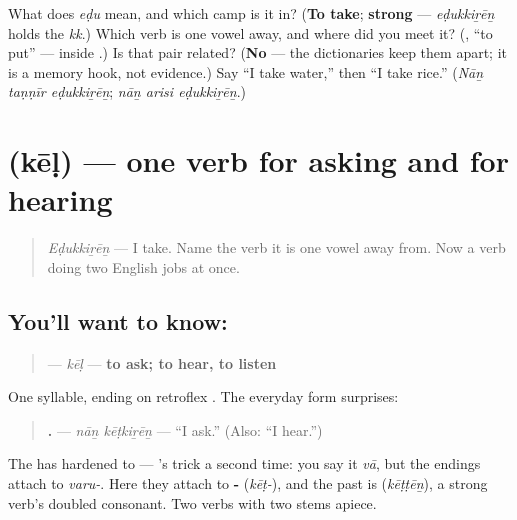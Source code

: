\begin{tcolorbox}[breakable,colback=teal!4,colframe=teal!35!black,title={Before you move on}]
What does \emph{eḍu} mean, and which camp is it in? (\textbf{To take}; \textbf{strong} — \emph{eḍukkiṟēṉ} holds the \emph{kk}.) Which verb is one vowel away, and where did you meet it? (\emph{\textbf{}}, \textquotedblleft{}to put\textquotedblright{} — inside \textbf{}.) Is that pair related? (\textbf{No} — the dictionaries keep them apart; it is a memory hook, not evidence.) Say \textquotedblleft{}I take water,\textquotedblright{} then \textquotedblleft{}I take rice.\textquotedblright{} (\emph{Nāṉ taṇṇīr eḍukkiṟēṉ}; \emph{nāṉ arisi eḍukkiṟēṉ}.)
\end{tcolorbox}
\section[\texorpdfstring{\ta{கேள்} (kēḷ)}{கேள் (kēḷ)}]{ (kēḷ) — one verb for asking and for hearing}

\label{lesson:TA-C34-kel}



\begin{quote}
\emph{Eḍukkiṟēṉ} — I take. Name the verb it is one vowel away from. Now a verb doing two English jobs at once.
\end{quote}

\subsection*{You'll want to know: }
\begin{quote}
\textbf{} — \emph{kēḷ} — \textbf{to ask; to hear, to listen}
\end{quote}

One syllable, ending on retroflex \textbf{}. The everyday form surprises:

\begin{quote}
\textbf{ .} — \emph{nāṉ kēṭkiṟēṉ} — \textquotedblleft{}I ask.\textquotedblright{} (Also: \textquotedblleft{}I hear.\textquotedblright{})
\end{quote}

The \textbf{} has hardened to \textbf{} — \textbf{}'s trick a second time: you say it \emph{vā}, but the endings attach to \emph{varu-}. Here they attach to \textbf{-} (\emph{kēṭ-}), and the past is \textbf{} (\emph{kēṭṭēṉ}), a strong verb's doubled consonant. Two verbs with two stems apiece.


